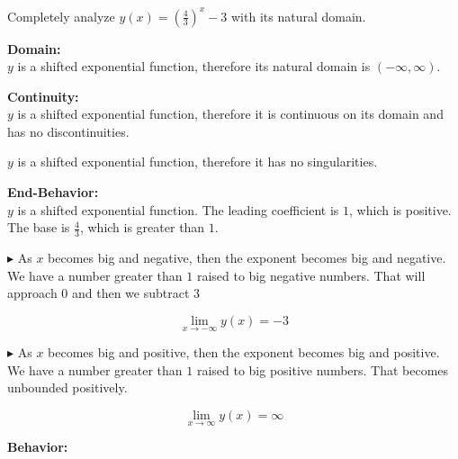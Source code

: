 \documentclass{ximera}
\author{Lee Wayand}
\begin{document}
\begin{exercise}



Completely analyze $y(x) = \left(\frac{4}{3}\right)^x - 3$ with its natural domain.



\textbf{\textcolor{blue!55!black}{Domain:}}  \\

$y$ is a shifted exponential function, therefore its natural domain is $(-\infty, \infty)$.




\textbf{\textcolor{blue!55!black}{Continuity:}}  \\

$y$ is a shifted exponential function, therefore it is continuous on its domain and has no discontinuities.


$y$ is a shifted exponential function, therefore it has no singularities.




\textbf{\textcolor{blue!55!black}{End-Behavior:}}  \\



$y$ is a shifted exponential function. The leading coefficient is $1$, which is positive.  The base is $\frac{4}{3}$, which is greater than $1$.  


$\blacktriangleright$ As $x$ becomes big and negative, then the exponent becomes big and negative.  We have a number greater than $1$ raised to big negative numbers.  That will approach $0$ and then we subtract $3$

\[
\lim\limits_{x \to -\infty} y(x) = -3
\]






$\blacktriangleright$ As $x$ becomes big and positive, then the exponent becomes big and positive.  We have a number greater than $1$ raised to big positive numbers. That becomes unbounded positively.

\[
\lim\limits_{x \to \infty} y(x) = \infty
\]


















\textbf{\textcolor{blue!55!black}{Behavior:}}  \\


\end{exercise}
\end{document}
